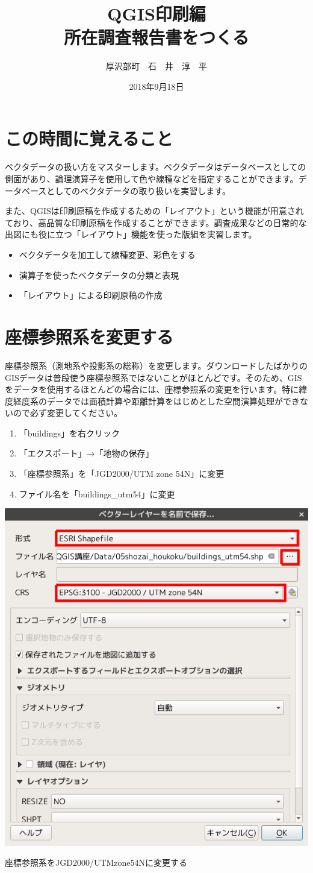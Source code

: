 \documentclass[14Q,twocolumn]{jsarticle}
\title{QGIS印刷編\\{\large 所在調査報告書をつくる}}%
\date{2018年9月18日}
\author{厚沢部町　石　井　淳　平}              %
\makeatletter
\newenvironment{figurehere}
  {\def\@captype{figure}}
  {}
\makeatother
\begin{document}
\maketitle
\section{この時間に覚えること}
ベクタデータの扱い方をマスターします。ベクタデータはデータベースとしての側面があり、論理演算子を使用して色や線種などを指定することができます。データベースとしてのベクタデータの取り扱いを実習します。

また、QGISは印刷原稿を作成するための「レイアウト」という機能が用意されており、高品質な印刷原稿を作成することができます。調査成果などの日常的な出図にも役に立つ「レイアウト」機能を使った版組を実習します。

\begin{itemize}
\item ベクタデータを加工して線種変更、彩色をする
\item 演算子を使ったベクタデータの分類と表現
\item 「レイアウト」による印刷原稿の作成
\end{itemize}


\section{座標参照系を変更する}
座標参照系（測地系や投影系の総称）を変更します。ダウンロードしたばかりのGISデータは普段使う座標参照系ではないことがほとんどです。そのため、GISをデータを使用するほとんどの場合には、座標参照系の変更を行います。特に緯度経度系のデータでは面積計算や距離計算をはじめとした空間演算処理ができないので必ず変更してください。

\begin{enumerate}
\item 「buildings」を右クリック
\item 「エクスポート」→「地物の保存」
\item  「座標参照系」を「JGD2000/UTM zone 54N」に変更
\item ファイル名を「buildings\_utm54」に変更
\end{enumerate}

\begin{figurehere}
\centering
\includegraphics[width=0.5\linewidth]{04.png}
\caption{座標参照系をJGD2000/UTMzone54Nに変更する}
\end{figurehere}
\end{document}
